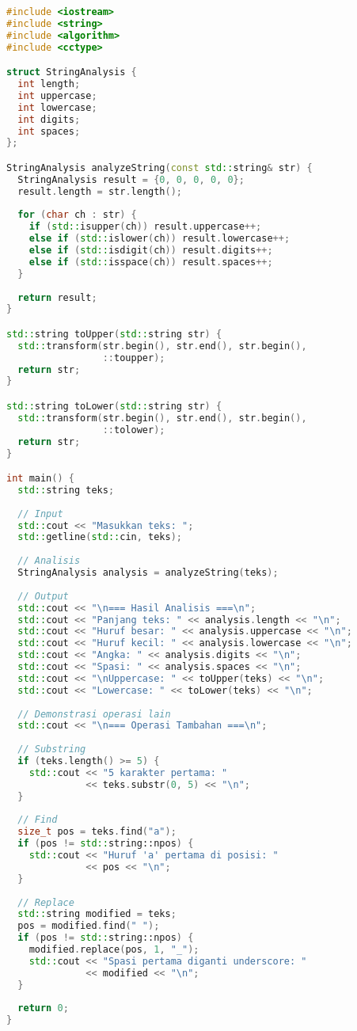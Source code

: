 \documentclass[../main.tex]{subfiles}
\begin{document}
\begin{lstlisting}[language=C++, caption={Program pengolahan string di C++}]
#include <iostream>
#include <string>
#include <algorithm>
#include <cctype>

struct StringAnalysis {
  int length;
  int uppercase;
  int lowercase;
  int digits;
  int spaces;
};

StringAnalysis analyzeString(const std::string& str) {
  StringAnalysis result = {0, 0, 0, 0, 0};
  result.length = str.length();
  
  for (char ch : str) {
    if (std::isupper(ch)) result.uppercase++;
    else if (std::islower(ch)) result.lowercase++;
    else if (std::isdigit(ch)) result.digits++;
    else if (std::isspace(ch)) result.spaces++;
  }
  
  return result;
}

std::string toUpper(std::string str) {
  std::transform(str.begin(), str.end(), str.begin(), 
                 ::toupper);
  return str;
}

std::string toLower(std::string str) {
  std::transform(str.begin(), str.end(), str.begin(), 
                 ::tolower);
  return str;
}

int main() {
  std::string teks;
  
  // Input
  std::cout << "Masukkan teks: ";
  std::getline(std::cin, teks);
  
  // Analisis
  StringAnalysis analysis = analyzeString(teks);
  
  // Output
  std::cout << "\n=== Hasil Analisis ===\n";
  std::cout << "Panjang teks: " << analysis.length << "\n";
  std::cout << "Huruf besar: " << analysis.uppercase << "\n";
  std::cout << "Huruf kecil: " << analysis.lowercase << "\n";
  std::cout << "Angka: " << analysis.digits << "\n";
  std::cout << "Spasi: " << analysis.spaces << "\n";
  std::cout << "\nUppercase: " << toUpper(teks) << "\n";
  std::cout << "Lowercase: " << toLower(teks) << "\n";
  
  // Demonstrasi operasi lain
  std::cout << "\n=== Operasi Tambahan ===\n";
  
  // Substring
  if (teks.length() >= 5) {
    std::cout << "5 karakter pertama: " 
              << teks.substr(0, 5) << "\n";
  }
  
  // Find
  size_t pos = teks.find("a");
  if (pos != std::string::npos) {
    std::cout << "Huruf 'a' pertama di posisi: " 
              << pos << "\n";
  }
  
  // Replace
  std::string modified = teks;
  pos = modified.find(" ");
  if (pos != std::string::npos) {
    modified.replace(pos, 1, "_");
    std::cout << "Spasi pertama diganti underscore: " 
              << modified << "\n";
  }
  
  return 0;
}
\end{lstlisting}
\end{document}
